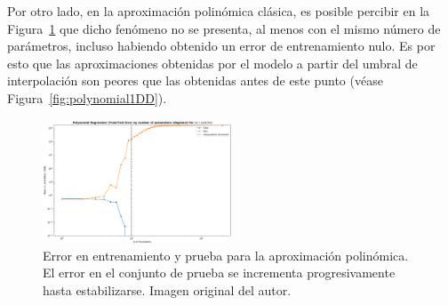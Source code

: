 Por otro lado, en la aproximación polinómica clásica, es posible percibir en la Figura~\ref{fig:OLS1DDD} que dicho fenómeno no se presenta, al menos con el mismo número de parámetros, incluso habiendo obtenido un error de entrenamiento nulo. Es por esto que las aproximaciones obtenidas por el modelo a partir del umbral de interpolación son peores que las obtenidas antes de este punto (véase Figura~\ref{fig:polynomial1DD}).\newline

\begin{figure}[h]
    \centering
    \includegraphics[width=0.5\textwidth]{img/experiments/OLS1DDD.png}
    \caption[Error en entrenamiento y prueba para la aproximación polinómica.]{Error en entrenamiento y prueba para la aproximación polinómica. El error en el conjunto de prueba se incrementa progresivamente hasta estabilizarse. Imagen original del autor.}\label{fig:OLS1DDD}
\end{figure}

